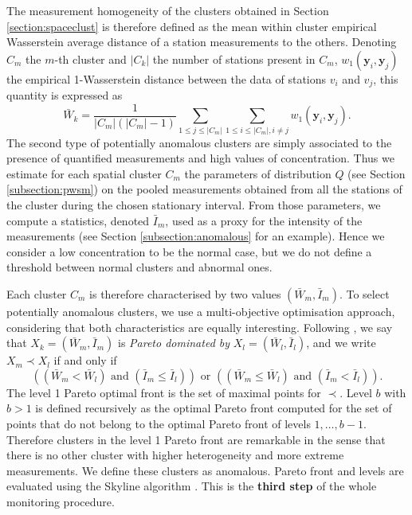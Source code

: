 The measurement homogeneity of the clusters obtained in Section \ref{section:spaceclust} is therefore defined as the mean within cluster empirical Wasserstein average distance of a station measurements to the others. Denoting $C_m$ the $m$-th cluster and $|C_k|$ the number of stations present in $C_m$, $w_1(\mathbf{y}_i,\mathbf{y}_j)$ the empirical 1-Wasserstein distance between the data of stations $v_i$ and $v_j$, this quantity is expressed as   
\begin{equation}
    \bar{W}_k = \frac{1}{|C_m|(|C_m|-1)}\sum_{1 \leq j \leq |C_m|}\sum_{1 \leq i \leq |C_m|, i \neq j}w_1(\mathbf{y}_i,\mathbf{y}_j).
\end{equation}
The second type of potentially anomalous clusters are simply associated to the presence of quantified measurements and high values of concentration. Thus we estimate for each spatial cluster $C_m$ the parameters of distribution $Q$ (see Section \ref{subsection:pwsm}) on the pooled measurements obtained from all the stations of the cluster during the chosen stationary interval. From those parameters, we compute a statistics, denoted $\bar{I}_m$, used as a proxy for the intensity of the measurements (see Section \ref{subsection:anomalous} for an example).  Hence we consider a low concentration to be the normal case, but we do not define a threshold between normal clusters and abnormal ones. 

Each cluster $C_m$ is therefore characterised by two values $(\bar{W}_m, \bar{I}_m)$. To select potentially anomalous clusters, we use a multi-objective optimisation approach, considering that both characteristics are equally interesting. Following \cite{KIELING2002311}, we say that  $X_k = (\bar{W}_m, \bar{I}_m)$ is \emph{Pareto dominated by} $X_l = (\bar{W}_l,\bar{I}_l)$, and we write $X_m \prec X_l$ if and only if
\begin{equation*}
    \left((\bar{W}_m<\bar{W}_l)\text{ and }(\bar{I}_m\leq \bar{I}_l)\right)
    \text{ or }\left((\bar{W}_m \leq \bar{W}_l)\text{ and }(\bar{I}_m < \bar{I}_l)\right).
\end{equation*}
The level 1 Pareto optimal front is the set of maximal points for $\prec$. Level $b$ with $b>1$ is defined recursively as the optimal Pareto front computed for the set of points that do not belong to the optimal Pareto front of levels $1,\ldots,b-1$. Therefore clusters in the level 1 Pareto front are remarkable in the sense that there is no other cluster with higher heterogeneity and more extreme measurements. We define these clusters as anomalous. Pareto front and levels are evaluated using the Skyline algorithm \cite{914855,endres2015scalagon}. This is the \textbf{third step} of the whole monitoring procedure.

